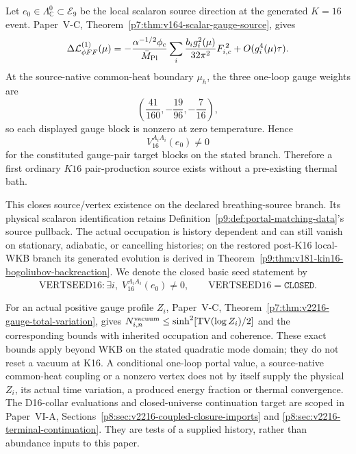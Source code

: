 \documentclass[12pt,a4paper]{article}
\begin{document}
\begin{corollary}
\label{p9:cor:v180-k16-zeroT-gauge-seed}
Let $e_0\in\Lambda^0_{\mathbb C}\subset\mathcal E_9$ be the local scalaron
source direction at the generated $K=16$ event.  Paper~V-C,
Theorem~\ref{p7:thm:v164-scalar-gauge-source}, gives
\[
 \Delta\mathcal L_{\phi FF}^{(1)}(\mu)
 =-\frac{\alpha^{-1/2}\phi_c}{\bar M_{\rm Pl}}
 \sum_i\frac{b_i g_i^2(\mu)}{32\pi^2}F_{i,c}^{\,2}
 +O(g_i^4(\mu)\tau).
\]
At the source-native common-heat boundary \(\mu_h\), the three one-loop gauge
weights are
\[
 \boxed{\left(\frac{41}{160},-\frac{19}{96},-\frac7{16}\right)},
\]
so each displayed gauge block is nonzero at zero temperature.  Hence
\[
 \boxed{V_{16}^{A_iA_i}(e_0)\neq0}
\]
for the constituted gauge-pair target blocks on the stated branch.  Therefore
a first ordinary $K16$ pair-production source exists without a pre-existing
thermal bath.

This closes source/vertex existence on the declared breathing-source
branch.  Its physical scalaron identification retains
Definition~\ref{p9:def:portal-matching-data}'s source pullback.
The actual occupation is history
dependent and can still vanish on stationary, adiabatic, or cancelling
histories; on the restored post-K16 local-WKB branch its generated evolution is
derived in Theorem~\ref{p9:thm:v181-kin16-bogoliubov-backreaction}.  We denote
the closed basic seed statement by
\[
 \boxed{\mathrm{VERTSEED16}:\exists i,\;V_{16}^{A_iA_i}(e_0)\neq0},
 \qquad \mathrm{VERTSEED16}=\texttt{CLOSED}.
\]
\end{corollary}

\begin{remark}
\label{p9:rem:v2216-gauge-variation-import}
For an actual positive gauge profile $Z_i$,
Paper~V-C, Theorem~\ref{p7:thm:v2216-gauge-total-variation}, gives
$N_{i,n}^{\rm vacuum}\le\sinh^2[\operatorname{TV}(\log Z_i)/2]$
and the corresponding bounds with inherited occupation and coherence.
These exact bounds apply beyond WKB on the stated quadratic mode domain;
they do not reset a vacuum at K16.  A conditional one-loop portal value,
a source-native common-heat coupling or a nonzero vertex does not by
itself supply the physical $Z_i$, its actual time variation, a produced
energy fraction or thermal convergence.  The D16-collar evaluations and
closed-universe continuation target are scoped in Paper~VI-A,
Sections~\ref{p8:sec:v2216-coupled-closure-imports} and
\ref{p8:sec:v2216-terminal-continuation}.  They are tests of a supplied
history, rather than abundance inputs to this paper.
\end{remark}
\end{document}
